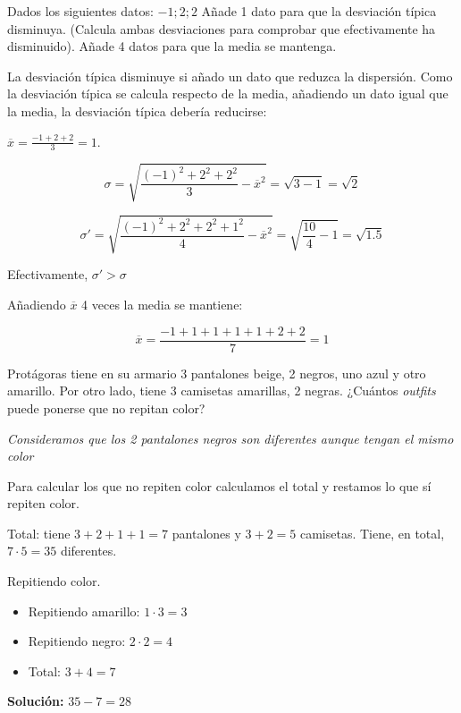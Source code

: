 \documentclass[palatino,nosec,nochap]{Docencia}
\begin{document}
\begin{problem}
Dados los siguientes datos:  $-1;2;2$
\ppart Añade 1 dato para que la desviación típica disminuya. (Calcula ambas desviaciones para comprobar que efectivamente ha disminuido).
\ppart Añade 4 datos para que la media se mantenga.

\solution

\spart La desviación típica disminuye si añado un dato que reduzca la dispersión. Como la desviación típica se calcula respecto de la media, añadiendo un dato igual que la media, la desviación típica debería reducirse:

$\overline{x} = \frac{-1+2+2}{3} = 1$.

\[ \sigma = \sqrt{\frac{(-1)^2+2^2+2^2}{3} - \overline{x}^2 }= \sqrt{3-1} = \sqrt{2}\]


\[ \sigma' = \sqrt{\frac{(-1)^2+2^2+2^2+1^2}{4} - \overline{x}^2 }= \sqrt{\frac{10}{4}-1} = \sqrt{1.5}\]

Efectivamente, $\sigma' > \sigma$

\spart  Añadiendo $\overline{x}$ 4 veces la media se mantiene:

\[
\overline{x} = \frac{-1+1+1+1+1+2+2}{7} = 1
\]

\end{problem}

\begin{problem}
Protágoras tiene en su armario 3 pantalones beige, 2 negros, uno azul y otro amarillo. Por otro lado, tiene 3 camisetas amarillas, 2 negras. ¿Cuántos \textit{outfits} puede ponerse que no repitan color?

\solution

\textit{Consideramos que los 2 pantalones negros son diferentes aunque tengan el mismo color}


Para calcular los que no repiten color calculamos el total y restamos lo que sí repiten color.

Total: tiene $3+2+1+1 = 7$ pantalones y $3+2 = 5$ camisetas. Tiene, en total, $7·5=35$ diferentes.

Repitiendo color. 
\begin{itemize}
	\item Repitiendo amarillo: $1·3=3$
	\item Repitiendo negro: $2·2=4$
	\item Total: $3+4=7$
\end{itemize}

\textbf{Solución: } $35-7=28$

\end{problem}
\end{document}
